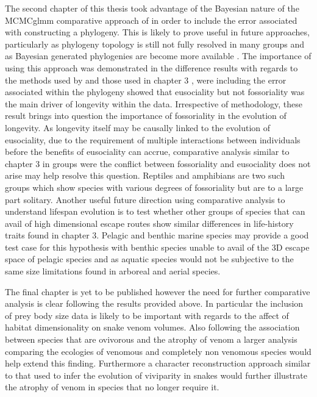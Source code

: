 The second chapter of this thesis took advantage of the Bayesian nature of the MCMCglmm comparative approach of \citep{hadfield2010mcmc} in order to include the error associated with constructing a phylogeny. This is likely to prove useful in future approaches, particularly as phylogeny topology is still not fully resolved in many groups \citep{jetz2012global,burleigh2015building,pyron2014early} and as Bayesian generated phylogenies are become more available \citep{arnold201010ktrees,jetz2012global}. The importance of using this approach was demonstrated in the difference results with regards to the methods used by \cite{williams2015ecology} and those used in chapter 3 \cite{healy2014ecology}, were including the error associated within the phylogeny showed that eusociality but not fossoriality was the main driver of longevity within the data. Irrespective of methodology, these result brings into question the importance of fossoriality in the evolution of longevity. As longevity itself may be causally linked to the evolution of eusociality, due to the requirement of multiple interactions between individuals before the benefits of eusociality can accrue, comparative analysis similar to chapter 3 in groups were the conflict between fossoriality and eusociality does not arise may help resolve this question. Reptiles and amphibians are two such groups which show species with various degrees of fossoriality but are to a large part solitary. Another useful future direction using comparative analysis to understand lifespan evolution is to test whether other groups of species that can avail of high dimensional escape routes show similar differences in life-history traits found in chapter 3. Pelagic and benthic marine species may provide a good test case for this hypothesis with benthic species unable to avail of the 3D escape space of pelagic species and as aquatic species would not be subjective to the same size limitations found in arboreal and aerial species.

The final chapter is yet to be published however the need for further comparative analysis is clear following the results provided above. In particular the inclusion of prey body size data is likely to be important with regards to the affect of habitat dimensionality on snake venom volumes. Also following the association between species that are ovivorous and the atrophy of venom a larger analysis comparing the ecologies of venomous and completely non venomous species would help extend this finding.  Furthermore a character reconstruction approach similar to that used to infer the evolution of viviparity in snakes \citep{pyron2014early} would further illustrate the atrophy of venom in species that no longer require it. 


